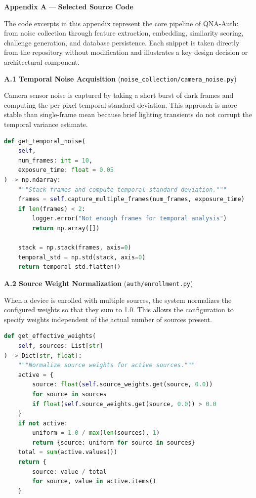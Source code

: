 \begin{center}
	{\Large \textbf{Appendix A}} --- \vspace*{0.5cm}
	{\Large \textbf{Selected Source Code}}
\end{center}

The code excerpts in this appendix represent the core pipeline of QNA-Auth: from noise collection through feature extraction, embedding, similarity scoring, challenge generation, and database persistence. Each snippet is taken directly from the repository without modification and illustrates a key design decision or architectural component.

\vspace{0.5cm}
\noindent\textbf{A.1 \quad Temporal Noise Acquisition} (\texttt{noise\_collection/camera\_noise.py})

\vspace{0.3cm}
Camera sensor noise is captured by taking a short burst of dark frames and computing the per-pixel temporal standard deviation. This approach is more stable than single-frame mean because brief lighting transients do not corrupt the temporal variance estimate.

\begin{lstlisting}[language=Python, basicstyle=\ttfamily\small]
def get_temporal_noise(
    self,
    num_frames: int = 10,
    exposure_time: float = 0.05
) -> np.ndarray:
    """Stack frames and compute temporal standard deviation."""
    frames = self.capture_multiple_frames(num_frames, exposure_time)
    if len(frames) < 2:
        logger.error("Not enough frames for temporal analysis")
        return np.array([])

    stack = np.stack(frames, axis=0)
    temporal_std = np.std(stack, axis=0)
    return temporal_std.flatten()
\end{lstlisting}

\vspace{0.5cm}
\noindent\textbf{A.2 \quad Source Weight Normalization} (\texttt{auth/enrollment.py})

\vspace{0.3cm}
When a device is enrolled with multiple sources, the system normalizes the configured weights so that they sum to 1.0. This allows the configuration to specify weights independent of the actual number of sources present.

\begin{lstlisting}[language=Python, basicstyle=\ttfamily\small]
def get_effective_weights(
    self, sources: List[str]
) -> Dict[str, float]:
    """Normalize source weights for active sources."""
    active = {
        source: float(self.source_weights.get(source, 0.0))
        for source in sources
        if float(self.source_weights.get(source, 0.0)) > 0.0
    }
    if not active:
        uniform = 1.0 / max(len(sources), 1)
        return {source: uniform for source in sources}
    total = sum(active.values())
    return {
        source: value / total
        for source, value in active.items()
    }
\end{lstlisting}

